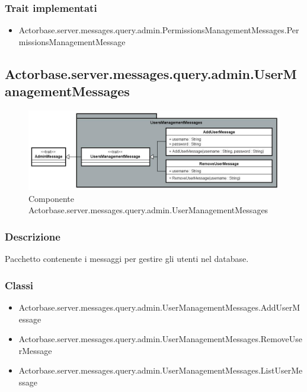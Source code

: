 \documentclass[a4paper]{article}
\begin{document}
			\subsubsection{Trait implementati}
				\begin{itemize}
					\item Actorbase.server.messages.query.admin.PermissionsManagementMessages.PermissionsManagementMessage
				\end{itemize}
				
		\subsection{Actorbase.server.messages.query.admin.UserManagementMessages}
		
			\begin{figure}[H]
				\centering
				\includegraphics[width=\textwidth]{ST/Server/userManagementLevel.jpg}
				\caption{Componente Actorbase.server.messages.query.admin.UserManagementMessages}
			\end{figure}
			
			\subsubsection{Descrizione}
				Pacchetto contenente i messaggi per gestire gli utenti nel database.
				
			\subsubsection{Classi}
				\begin{itemize}
					\item Actorbase.server.messages.query.admin.UserManagementMessages.AddUserMessage
					\item Actorbase.server.messages.query.admin.UserManagementMessages.RemoveUserMessage
					\item Actorbase.server.messages.query.admin.UserManagementMessages.ListUserMessage
				\end{itemize}
				
\end{document}
